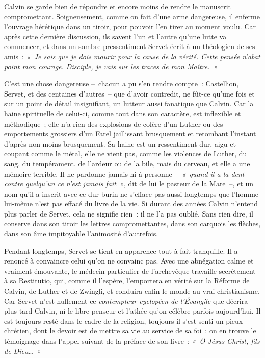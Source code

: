 \documentclass[french,twoside]{book} %
\newcommand{\astermono}{\medskip\centerline{\color{rubric}\large\selectfont{\syms ✻}}\medskip\par}%
\begin{document}
\noindent Calvin se garde bien de répondre et encore moins de rendre le manuscrit compromettant. Soigneusement, comme on fait d’une arme dangereuse, il enferme l’ouvrage hérétique dans un tiroir, pour pouvoir l’en tirer au moment voulu. Car après cette dernière discussion, ils savent l’un et l’autre qu’une lutte va commencer, et dans un sombre pressentiment Servet écrit à un théologien de ses amis : \emph{« Je sais que je dois mourir pour la cause de la vérité. Cette pensée n’abat point mon courage. Disciple, je vais sur les traces de mon Maître. »}\par

\astermono

\noindent C’est une chose dangereuse – chacun a pu s’en rendre compte : Castellion, Servet, et des centaines d’autres – que d’avoir contredit, ne fût-ce qu’une fois et sur un point de détail insignifiant, un lutteur aussi fanatique que Calvin. Car la haine spirituelle de celui-ci, comme tout dans son caractère, est inflexible et méthodique ; elle n’a rien des explosions de colère d’un Luther ou des emportements grossiers d’un Farel jaillissant brusquement et retombant l’instant d’après non moins brusquement. Sa haine est un ressentiment dur, aigu et coupant comme le métal, elle ne vient pas, comme les violences de Luther, du sang, du tempérament, de l’ardeur ou de la bile, mais du cerveau, et elle a une mémoire terrible. Il ne pardonne jamais ni à personne – \emph{« quand il a la dent contre quelqu’un ce n’est jamais fait »}, dit de lui le pasteur de la Mare –, et un nom qu’il a inscrit avec ce dur burin ne s’efface pas aussi longtemps que l’homme lui-même n’est pas effacé du livre de la vie. Si durant des années Calvin n’entend plus parler de Servet, cela ne signifie rien : il ne l’a pas oublié. Sans rien dire, il conserve dans son tiroir les lettres compromettantes, dans son carquois les flèches, dans son âme impitoyable l’animosité d’autrefois.\par
Pendant longtemps, Servet se tient en apparence tout à fait tranquille. Il a renoncé à convaincre celui qu’on ne convainc pas. Avec une abnégation calme et vraiment émouvante, le médecin particulier de l’archevêque travaille secrètement à sa Restitutio, qui, comme il l’espère, l’emportera en vérité sur la Réforme de Calvin, de Luther et de Zwingli, et conduira enfin le monde au vrai christianisme. Car Servet n’est nullement ce \emph{contempteur cyclopéen de l’Évangile} que décrira plus tard Calvin, ni le libre penseur et l’athée qu’on célèbre parfois aujourd’hui. Il est toujours resté dans le cadre de la religion, toujours il s’est senti un pieux chrétien, dont le devoir est de mettre sa vie au service de sa foi ; on en trouve le témoignage dans l’appel suivant de la préface de son livre : \emph{« Ô Jésus-Christ, fils de Dieu… »}\par
\end{document}
